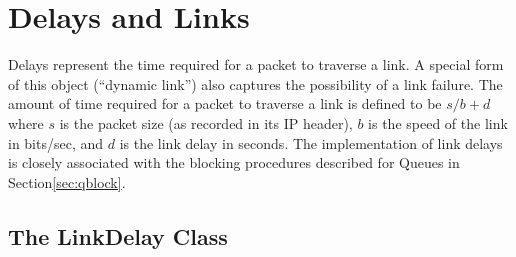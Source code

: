 %
%
\chapter{Delays and Links}
\label{chap:delays}

Delays represent the time required for a packet to
traverse a link.
A special form of this object (``dynamic link'')
also captures the possibility of a link failure.
The amount of time required for a packet to traverse a link
is defined to be $s/b + d$ where $s$ is the packet size
(as recorded in its IP header), $b$ is the speed of the link
in bits/sec, and $d$ is the link delay in seconds.
The implementation of link delays is closely associated with
the blocking procedures described for Queues in
Section\ref{sec:qblock}.

\section{The LinkDelay Class}
\label{sec:delayclass}

